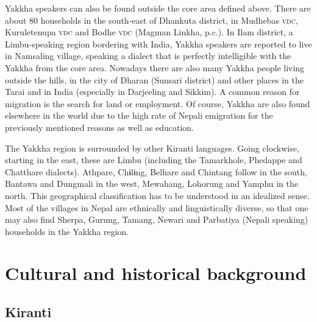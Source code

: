 Yakkha speakers can also be found outside the core area defined above. There are about 80 households in the south-east of Dhankuta district, in Mudhebas \textsc{vdc}, Kuruletenupa \textsc{vdc} and Bodhe \textsc{vdc} (Magman Linkha, p.c.). In Ilam district, a Limbu-speaking region bordering with India, Yakkha speakers are reported to live in Namsaling village, speaking a dialect that is perfectly intelligible with the Yakkha from the core area. Nowadays there are also many Yakkha people living outside the hills, in the city of Dharan (Sunsari district) and other places in the Tarai and in India (especially in Darjeeling and Sikkim). A common reason for migration is the search for land or employment. Of course, Yakkha are also found elsewhere in the world due to the high rate of Nepali emigration for the previously mentioned reasons as well as education. 

The Yakkha region is surrounded by other Kiranti languages. Going clockwise, starting in the east, these are Limbu (including the Tamarkhole, Phedappe  and Chatthare dialects). Athpare,  Chɨlɨng, Belhare and Chintang follow in the south, Bantawa and Dungmali in the west, Mewahang, Lohorung and Yamphu in the north. This geographical classification has to be understood in an idealized sense. Most of the villages in Nepal are ethnically and linguistically diverse, so that one may also find Sherpa, Gurung, Tamang, Newari and Parbatiya (Nepali speaking) households in the Yakkha region.

  

\section{Cultural and historical background}\label{cult-hist}

\subsection{Kiranti}


